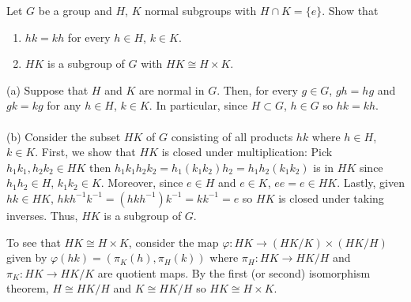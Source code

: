 \begin{problem}
  Let $G$ be a group and $H$, $K$ normal subgroups with $H\cap
  K=\{e\}$. Show that
  \begin{enumerate}[label=(\alph*),noitemsep]
  \item $hk=kh$ for every $h\in H$, $k\in K$.
  \item $HK$ is a subgroup of $G$ with $HK\cong H\times K$.
  \end{enumerate}
\end{problem}
\begin{solution}
  (a) Suppose that $H$ and $K$ are normal in $G$. Then, for every $g\in G$,
  $gh=hg$ and $gk=kg$ for any $h\in H$, $k\in K$. In particular, since
  $H\subset G$, $h\in G$ so $hk=kh$.
  \\\\
  (b) Consider the subset $HK$ of $G$ consisting of all products $hk$ where
  $h\in H$, $k\in K$. First, we show that $HK$ is closed under
  multiplication: Pick $h_1k_1,h_2k_2\in HK$ then
  $h_1k_1h_2k_2=h_1(k_1k_2)h_2=h_1h_2(k_1k_2)$ is in $HK$ since $h_1h_2\in
  H$, $k_1k_2\in K$. Moreover, since $e\in H$ and $e\in K$, $ee=e\in
  HK$. Lastly, given $hk\in HK$,
  $hkh^{-1}k^{-1}=(hkh^{-1})k^{-1}=kk^{-1}=e$ so $HK$ is closed under
  taking inverses. Thus, $HK$ is a subgroup of $G$.

  To see that $HK\cong H\times K$, consider the map
  $\varphi\colon HK\to (HK/K)\times(HK/H)$ given by
  $\varphi(hk)=(\pi_K(h),\pi_H(k))$ where $\pi_H\colon HK\to HK/H$
  and $\pi_K\colon HK\to HK/K$ are quotient maps. By the first (or second)
  isomorphism theorem, $H\cong HK/H$ and $K\cong HK/H$ so $HK\cong
  H\times K$.
\end{solution}

